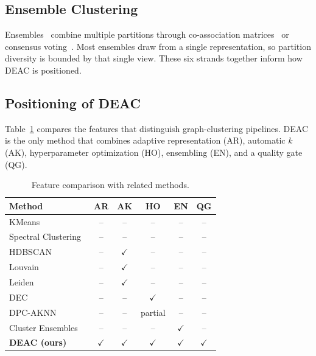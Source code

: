 \documentclass[conference]{IEEEtran}
\begin{document}
\subsection{Ensemble Clustering}
Ensembles~\cite{strehl2002cluster} combine multiple partitions through co-association matrices~\cite{fred2005combining} or consensus voting~\cite{vega2011survey}. Most ensembles draw from a single representation, so partition diversity is bounded by that single view. These six strands together inform how DEAC is positioned.

\subsection{Positioning of DEAC}
Table~\ref{tab:related} compares the features that distinguish graph-clustering pipelines. DEAC is the only method that combines adaptive representation (AR), automatic $k$ (AK), hyperparameter optimization (HO), ensembling (EN), and a quality gate (QG).

\begin{table}[htbp]
\centering
\caption{Feature comparison with related methods.}
\label{tab:related}
\footnotesize
\setlength{\tabcolsep}{3pt}
\begin{tabular}{lccccc}
\toprule
Method & AR & AK & HO & EN & QG \\
\midrule
KMeans~\cite{lloyd1982least} & -- & -- & -- & -- & -- \\
Spectral Clustering~\cite{ng2001spectral} & -- & -- & -- & -- & -- \\
HDBSCAN~\cite{campello2013density} & -- & $\checkmark$ & -- & -- & -- \\
Louvain~\cite{blondel2008fast} & -- & $\checkmark$ & -- & -- & -- \\
Leiden~\cite{traag2019louvain} & -- & $\checkmark$ & -- & -- & -- \\
DEC~\cite{xie2016unsupervised} & -- & -- & $\checkmark$ & -- & -- \\
DPC-AKNN~\cite{wang2026density} & -- & -- & partial & -- & -- \\
Cluster Ensembles~\cite{strehl2002cluster} & -- & -- & -- & $\checkmark$ & -- \\
\textbf{DEAC (ours)} & $\checkmark$ & $\checkmark$ & $\checkmark$ & $\checkmark$ & $\checkmark$ \\
\bottomrule
\end{tabular}
\end{table}

\end{document}
